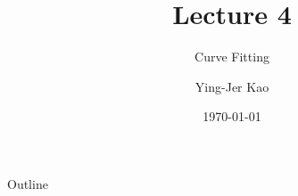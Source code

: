 \documentclass{beamer}
\title[Curve Fitting and Root Finding] %
{Lecture 4}
\subtitle
{Curve Fitting} %
\author[Ying-Jer Kao] %
{Ying-Jer Kao}
\institute[National Taiwan University] %
{
  Department of Physics\\
 National Taiwan University
  }
\date[Numerical Analysis and Programming] %
{\today}
\begin{document}
\begin{frame}
  \titlepage
\end{frame}

\begin{frame}{Outline}
  \tableofcontents
\end{frame}



\end{document}
